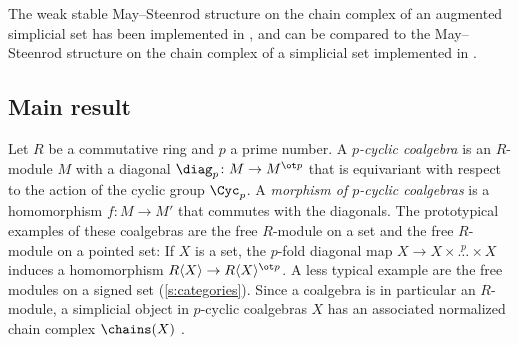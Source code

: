 The weak stable May--Steenrod structure on the chain complex of an augmented simplicial set has been implemented in \cite{github-oddp}, and can be compared to the May--Steenrod structure on the chain complex of a simplicial set implemented in \cite{github-comch}.
 
 
 
 
 \subsection*{Main result} 
Let $R$ be a commutative ring and $p$ a prime number. A \emph{$p$-cyclic coalgebra} is an $R$-module $M$ with a diagonal $\diag_p\colon M\to M^{\ot p}$ that is equivariant with respect to the action of the cyclic group $\Cyc_p$. A \emph{morphism of $p$-cyclic coalgebras} is a homomorphism $f\colon M\to M'$ that commutes with the diagonals. The prototypical examples of these coalgebras are the free $R$-module on a set and the free $R$-module on a pointed set: If $X$ is a set, the $p$-fold diagonal map $X\to X\times \overset{p}{\ldots}\times X$ induces a homomorphism $R\langle X\rangle\to R\langle X\rangle^{\ot p}$. A less typical example are the free modules on a signed set (\cref{s:categories}). Since a coalgebra is in particular an $R$-module, a simplicial object in $p$-cyclic coalgebras $X$ has an associated normalized chain complex $\chains(X)$ .


